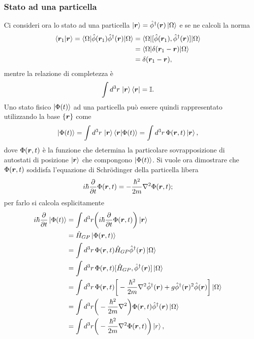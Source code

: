 \subsubsection{Stato ad una particella}
Ci consideri ora lo stato ad una particella $\ket{\bm{r}} = \hat{\phi}^\dagger(\bm{r})\ket{\Omega}$ e se ne calcoli la norma
\begin{equation}
    \begin{split}
        \langle \bm{r}_1 | \bm{r} \rangle = \langle \Omega | \hat{\phi}(\bm{r}_1)\hat{\phi}^\dagger(\bm{r}) | \Omega \rangle &= \langle \Omega | [\hat{\phi}(\bm{r}_1),\hat{\phi}^\dagger(\bm{r})] | \Omega \rangle \\
        &= \langle \Omega | \delta(\bm{r}_1 - \bm{r}) | \Omega \rangle \\
        &= \delta(\bm{r}_1 - \bm{r}),
    \end{split}
\end{equation}
mentre la relazione di completezza è
\begin{equation}
    \int d^3r\,\ket{\bm{r}}\bra{\bm{r}} = \mathbb{I}.
\end{equation}
Uno stato fisico $\ket{\Phi(t)}$ ad una particella può essere quindi rappresentato utilizzando la base $\{\bm{r}\}$ come
\begin{equation}
    \ket{\Phi(t)} = \int d^3r\,\ket{\bm{r}}\langle \bm{r} | \Phi(t) \rangle = \int d^3r\,\Phi(\bm{r},t)\ket{\bm{r}},
\end{equation}
dove $\Phi(\bm{r},t)$ è la funzione che determina la particolare sovrapposizione di autostati di posizione $\ket{\bm{r}}$ che compongono $\ket{\Phi(t)}$. Si vuole ora dimostrare che $\Phi(\bm{r},t)$ soddisfa l'equazione di Schr\"odinger della particella libera 
\begin{equation}
\label{eq: equazione di schrodinger della particella libera}
    i\hbar\frac{\partial}{\partial t}\Phi(\bm{r},t) = -\frac{\hbar^2}{2m}\nabla^2\Phi(\bm{r},t);
\end{equation}
per farlo si calcola esplicitamente
\begin{equation}
    \begin{split}
        i\hbar\frac{\partial}{\partial t}\ket{\Phi(t)} &= \int d^3r\bigg(i\hbar\frac{\partial}{\partial t}\Phi(\bm{r},t)\bigg)\ket{\bm{r}} \\
        &= \hat{H}_{GP}\ket{\Phi(\bm{r},t)} \\
        &= \int d^3r\,\Phi(\bm{r},t)\hat{H}_{GP}\hat{\phi}^\dagger(\bm{r})\ket{\Omega} \\
        &= \int d^3r\,\Phi(\bm{r},t)[\hat{H}_{GP},\hat{\phi}^\dagger(\bm{r})]\ket{\Omega} \\
        &= \int d^3r\,\Phi(\bm{r},t)\bigg[-\frac{\hbar^2}{2m}\nabla^2\hat{\phi}^\dagger(\bm{r}) + g\hat{\phi}^\dagger(\bm{r})^2\hat{\phi}(\bm{r})\bigg]\ket{\Omega} \\
        &= \int d^3r\bigg(-\frac{\hbar^2}{2m}\nabla^2\bigg)\Phi(\bm{r},t)\hat{\phi}^\dagger(\bm{r})\ket{\Omega} \\
        &= \int d^3r\bigg(-\frac{\hbar^2}{2m}\nabla^2\Phi(\bm{r},t)\bigg)\ket{r},
    \end{split}
\end{equation}
